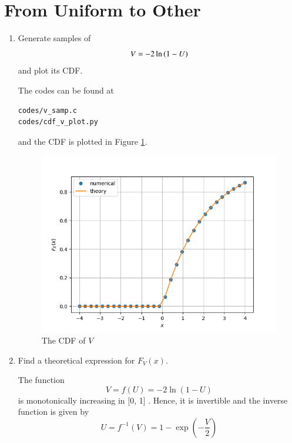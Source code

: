 \documentclass[journal,12pt,twocolumn]{IEEEtran}
\renewcommand\thesection{\arabic{section}}
\begin{document}
\section{From Uniform to Other}
\begin{enumerate}[label=\thesection.\arabic*
,ref=\thesection.\theenumi]
%
\item
Generate samples of 
%
\begin{equation}
V = -2\ln\left(1-U\right)
\end{equation}
%
and plot its CDF. 

\solution
The codes can be found at
\begin{lstlisting}
codes/v_samp.c
codes/cdf_v_plot.py
\end{lstlisting}
and the CDF is plotted in Figure \ref{fig:v_cdf}.

\begin{figure}[h!]
\centering
\includegraphics[width=\columnwidth]{./figs/v_cdf.png}
\caption{The CDF of $V$}
\label{fig:v_cdf}
\end{figure}

\item Find a theoretical expression for $F_V(x)$.

\solution
The function 
		\begin{equation}
			V = f(U) = -2\ln{(1 - U)}
		\end{equation}
is monotonically increasing in [0, 1] . Hence, it is invertible and the inverse function is given by
		\begin{equation}
			U = f^{-1}(V) = 1 - \exp{\left(-\frac{V}{2}\right)}
		\end{equation}
	

\end{enumerate}
\end{document}
